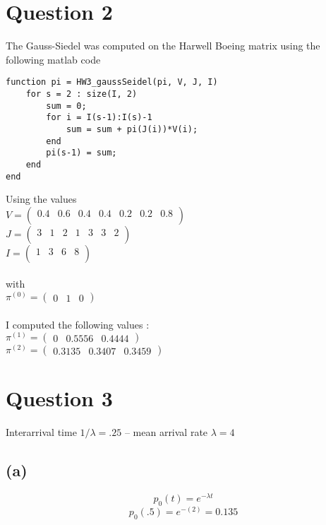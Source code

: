 \documentclass{article}
\begin{document}
\section*{Question 2}
The Gauss-Siedel was computed on the Harwell Boeing matrix using the following
matlab code 
\begin{lstlisting}[frame=single] 
 function pi = HW3_gaussSeidel(pi, V, J, I)
    for s = 2 : size(I, 2)  
        sum = 0;
        for i = I(s-1):I(s)-1
            sum = sum + pi(J(i))*V(i);
        end  
        pi(s-1) = sum;
    end
end 
\end{lstlisting}
Using the values \\
$ V = \left(\begin{array}{ccccccc}
	0.4 & 0.6 & 0.4 & 0.4 & 0.2 & 0.2 & 0.8 \\
\end{array}\right)$\\
$ J    = \left(\begin{array}{ccccccc}
	3 & 1 & 2 & 1 & 3 & 3 & 2 \\
\end{array}\right)$\\
$ I   = \left(\begin{array}{cccc}
	1 & 3 & 6 & 8 \\
\end{array}\right)$\\
\\
with \\
$\pi^{(0)} = \left(\begin{array}{ccc}
	0 & 1 & 0
\end{array}\right)$ \\ 
\\
I computed the following values :\\
$\pi^{(1)} = \left(\begin{array}{ccc}
	0  &  0.5556  &  0.4444
\end{array}\right)$ \\ 
$\pi^{(2)} = \left(\begin{array}{ccc}
0.3135   & 0.3407  &  0.3459
\end{array}\right)$ \\ 

\section*{Question 3}
Interarrival time $1/\lambda = .25$ -- mean arrival rate
$\lambda = 4$ \subsection*{(a)}
\[ p_0(t) = e^{-\lambda t}\]
\[ p_{0}(.5) = e^{-(2)} = 0.135 \]
\end{document}
